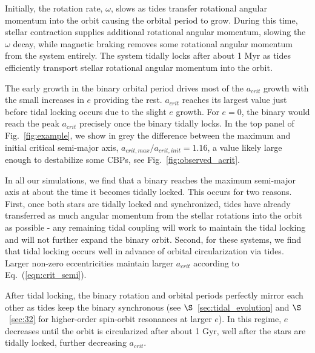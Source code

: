 Initially,  the rotation rate, $\omega$, slows as tides transfer rotational angular momentum into the orbit causing the orbital period to grow.  During this time, stellar contraction supplies additional rotational angular momentum, slowing the $\omega$ decay, while magnetic braking removes some rotational angular momentum from the system entirely.  The system tidally locks after about 1 Myr as tides efficiently transport stellar rotational angular momentum into the orbit.

The early growth in the binary orbital period drives most of the $a_{crit}$ growth with the small increases in $e$ providing the rest.  $a_{crit}$ reaches its largest value just before tidal locking occurs due to the slight $e$ growth.  For $e=0$, the binary would reach the peak $a_{crit}$ precisely once the binary tidally locks.  In the top panel of Fig.~\ref{fig:example}, we show in grey the difference between the maximum and initial critical semi-major axis, $a_{crit,max}/a_{crit,init} = 1.16$, a value likely large enough to destabilize some CBPs, see Fig.~\ref{fig:observed_acrit}.  

In all our simulations, we find that a binary reaches the maximum semi-major axis at about the time it becomes tidally locked.  This occurs for two reasons.  First, once both stars are tidally locked and synchronized, tides have already transferred as much angular momentum from the stellar rotations into the orbit as possible - any remaining tidal coupling will work to maintain the tidal locking and will not further expand the binary orbit.  Second, for these systems, we find that tidal locking occurs well in advance of orbital circularization via tides.  Larger non-zero eccentricities maintain larger $a_{crit}$ according to Eq.~(\ref{eqn:crit_semi}). 

After tidal locking, the binary rotation and orbital periods perfectly mirror each other as tides keep the binary synchronous (see $\S$~\ref{sec:tidal_evolution} and $\S$~\ref{sec:32} for higher-order spin-orbit resonances at larger $e$).  In this regime, $e$ decreases until the orbit is circularized after about 1 Gyr, well after the stars are tidally locked, further decreasing $a_{crit}$.

